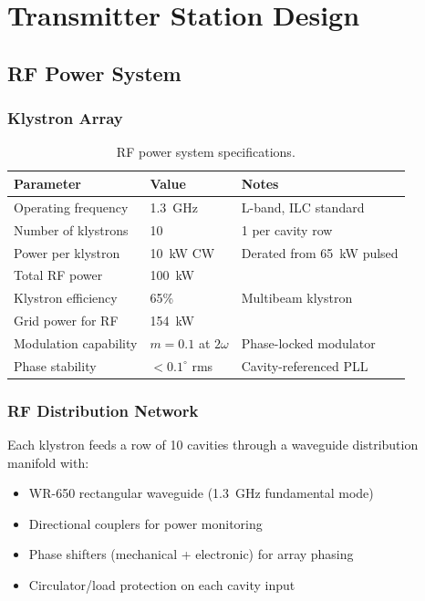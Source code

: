 \documentclass[11pt,letterpaper]{article}
\begin{document}
\section{Transmitter Station Design}

\subsection{RF Power System}

\subsubsection{Klystron Array}

\begin{table}[H]
\caption{RF power system specifications.}
\begin{tabular}{lll}
\toprule
Parameter & Value & Notes \\
\midrule
Operating frequency & 1.3~GHz & L-band, ILC standard \\
Number of klystrons & 10 & 1 per cavity row \\
Power per klystron & 10~kW CW & Derated from 65~kW pulsed \\
Total RF power & 100~kW & \\
Klystron efficiency & 65\% & Multibeam klystron \\
Grid power for RF & 154~kW & \\
Modulation capability & $m = 0.1$ at $2\omega$ & Phase-locked modulator \\
Phase stability & $< 0.1^\circ$ rms & Cavity-referenced PLL \\
\bottomrule
\end{tabular}
\end{table}

\subsubsection{RF Distribution Network}

Each klystron feeds a row of 10 cavities through a waveguide
distribution manifold with:
\begin{itemize}
\item WR-650 rectangular waveguide (1.3~GHz fundamental mode)
\item Directional couplers for power monitoring
\item Phase shifters (mechanical + electronic) for array phasing
\item Circulator/load protection on each cavity input
\end{itemize}
\end{document}
